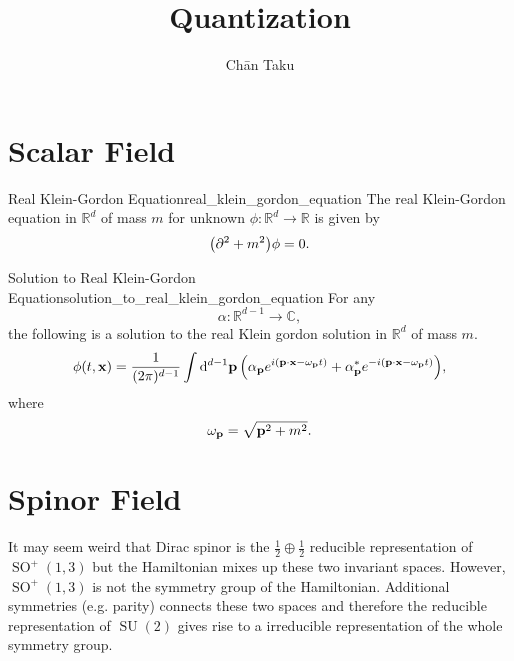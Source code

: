 \documentclass{article}
\title{Quantization}
\author{Ch\=an Taku}
\begin{document}
\maketitle

\section{Scalar Field}

\begin{definition}{Real Klein-Gordon Equation}{real_klein_gordon_equation}
    The real Klein-Gordon equation in $\mathbb{R}^d$ of mass $m$ for unknown $\phi:\mathbb{R}^{d} \rightarrow \mathbb{R}$ is given by
    \[ \qty(\partial^2 + m^2) \phi = 0. \]
\end{definition}

\begin{theorem}{Solution to Real Klein-Gordon Equation}{solution_to_real_klein_gordon_equation}
    For any
    \[ \alpha: \mathbb{R}^{d-1} \rightarrow \mathbb{C}, \]
    the following is a solution to the real Klein gordon solution in $\mathbb{R}^d$ of mass $m$.
    \[ \phi(t,\vb{x}) = \frac{1}{(2\pi)^{d-1}} \int \dd{^{d-1} \vb{p}} \qty(\alpha_{\vb{p}} e^{i(\vb{p}\cdot \vb{x} - \omega_{\vb{p}} t)} + \alpha^*_{\vb{p}} e^{-i(\vb{p}\cdot \vb{x} - \omega_{\vb{p}} t)}), \]
    where
    \[ \omega_{\vb{p}} = \sqrt{\vb{p}^2 + m^2}. \]
\end{theorem}

\section{Spinor Field}

It may seem weird that Dirac spinor is the $\frac{1}{2}\oplus \frac{1}{2}$ reducible representation of $\operatorname{SO}^+(1,3)$ but the Hamiltonian mixes up these two invariant spaces.
However, $\operatorname{SO}^+(1,3)$ is not the symmetry group of the Hamiltonian.
Additional symmetries (e.g. parity) connects these two spaces and therefore the reducible representation of $\operatorname{SU}(2)$ gives rise to a irreducible representation of the whole symmetry group.

% 
% 
\end{document}
